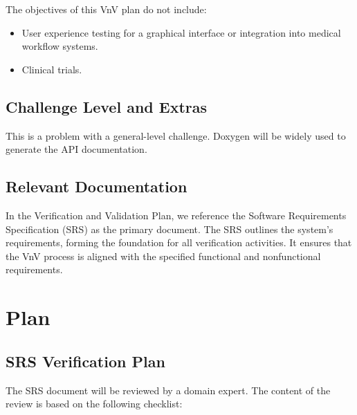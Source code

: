 \documentclass[12pt, titlepage]{article}
\begin{document}
\noindent The objectives of this VnV plan do not include:

\begin{itemize}
  \item User experience testing for a graphical interface or integration into
  medical workflow systems.
  \item Clinical trials.
\end{itemize}

\subsection{Challenge Level and Extras}

This is a problem with a general-level challenge. Doxygen will be widely used to
generate the API documentation.

\subsection{Relevant Documentation}

In the Verification and Validation Plan, we reference the Software Requirements
Specification (SRS) \citep{SRS} as the primary document. The SRS outlines the
system’s requirements, forming the foundation for all verification activities.
It ensures that the VnV process is aligned with the specified functional and
nonfunctional requirements.

\section{Plan}




\subsection{SRS Verification Plan}

The SRS document \citep{SRS} will be reviewed by a domain expert.  The content
of the review is based on the following checklist:
\end{document}
